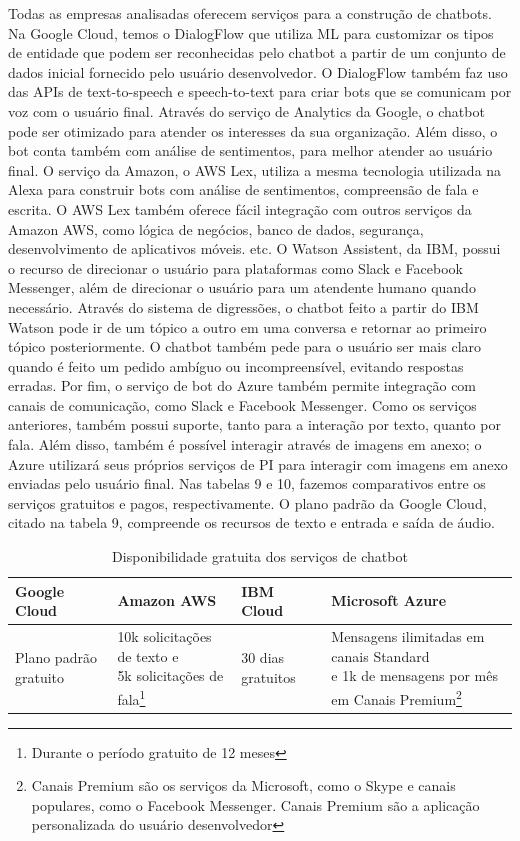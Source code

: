 \documentclass{article}
\begin{document}
Todas as empresas analisadas oferecem serviços para a construção de chatbots. Na Google Cloud, temos o DialogFlow que utiliza ML para customizar os tipos de entidade que podem ser reconhecidas pelo chatbot a partir de um conjunto de dados inicial fornecido pelo usuário desenvolvedor. O DialogFlow também faz uso das APIs de text-to-speech e speech-to-text para criar bots que se comunicam por voz com o usuário final. Através do serviço de Analytics da Google, o chatbot pode ser otimizado para atender os interesses da sua organização. Além disso, o bot conta também com análise de sentimentos, para melhor atender ao usuário final. O serviço da Amazon, o AWS Lex, utiliza a mesma tecnologia utilizada na Alexa para construir bots com análise de sentimentos, compreensão de fala e escrita. O AWS Lex também oferece fácil integração com outros serviços da Amazon AWS, como lógica de negócios, banco de dados, segurança, desenvolvimento de aplicativos móveis. etc. O Watson Assistent, da IBM, possui o recurso de direcionar o usuário para plataformas como Slack e Facebook Messenger, além de direcionar o usuário para um atendente humano quando necessário. Através do sistema de digressões, o chatbot feito a partir do IBM Watson pode ir de um tópico a outro em uma conversa e retornar ao primeiro tópico posteriormente. O chatbot também pede para o usuário ser mais claro quando é feito um pedido ambíguo ou incompreensível, evitando respostas erradas. Por fim, o serviço de bot do Azure também permite integração com canais de comunicação, como Slack e Facebook Messenger. Como os serviços anteriores, também possui suporte, tanto para a interação por texto, quanto por fala. Além disso, também é possível interagir através de imagens em anexo; o Azure utilizará seus próprios serviços de PI para interagir com imagens em anexo enviadas pelo usuário final. Nas tabelas 9 e 10, fazemos comparativos entre os serviços gratuitos e pagos, respectivamente. 
O plano padrão da Google Cloud, citado na tabela 9, compreende os recursos de texto e entrada e saída de áudio.

\begin{table}[!!ht]
 \caption{Disponibilidade gratuita dos serviços de chatbot}
  \centering
  \begin{tabular}{llll}
    \cmidrule(r){1-4}
    Google Cloud & Amazon AWS & IBM Cloud & Microsoft Azure \\
    \midrule
    Plano padrão gratuito
    & \makecell{10k solicitações de texto e \\ 5k solicitações de fala\footnote{Durante o período gratuito de 12 meses}}
    & 30 dias gratuitos
    & \makecell{Mensagens ilimitadas em canais Standard\\ e 1k de mensagens por mês em Canais Premium\footnote{Canais Premium são os serviços da Microsoft, como o Skype e canais populares, como o Facebook Messenger. Canais Premium são a aplicação personalizada do usuário desenvolvedor}} \\
    \bottomrule
  \end{tabular}
  \label{tab:table11}
\end{table}
\end{document}
